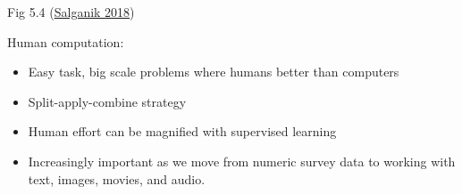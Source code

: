 \documentclass[aspectratio=169]{beamer}
\begin{document}
\begin{frame}

\begin{center}
\end{center}

\vfill
Fig 5.4 (\href{https://www.bitbybitbook.com/}{Salganik 2018})
\end{frame}
\begin{frame}

Human computation:
\begin{itemize}
\item Easy task, big scale problems where humans better than computers
\pause
\item Split-apply-combine strategy
\pause
\item Human effort can be magnified with supervised learning 
\pause
\item Increasingly important as we move from numeric survey data to working with text, images, movies, and audio.
\end{itemize}

\end{frame}
\end{document}
